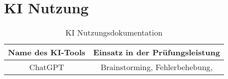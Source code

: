 \chapter{KI Nutzung}

\begin{table}[H]
    \centering
    \begin{tabular}{|c|c|}
        \hline
        \textbf{Name des KI-Tools} & \textbf{Einsatz in der Prüfungsleistung} \\
        \hline
        ChatGPT                    & Brainstorming, Fehlerbehebung,           \\ \hline
    \end{tabular}
    \caption{KI Nutzungsdokumentation}
    \label{table:ki-nutzung}
\end{table}